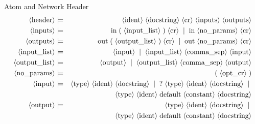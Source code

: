 Atom and Network Header
\begin{eqnarray*}
  \pn{header} &\pp&
    \pn{ident} \ww
    \pn{docstring} \ww
    \pn{cr} \ww
    \pn{inputs} \ww
    \pn{outputs} \\
  \pn{inputs} &\pp&
    \sm{in} \ww
    \sm{(} \ww
    \pn{input{\textunderscore}list} \ww
    \sm{)} \ww
    \pn{cr} \oo
    \sm{in} \ww
    \pn{no{\textunderscore}params} \ww
    \pn{cr} \\
  \pn{outputs} &\pp&
    \sm{out} \ww
    \sm{(} \ww
    \pn{output{\textunderscore}list} \ww
    \sm{)} \ww
    \pn{cr} \oo
    \sm{out} \ww
    \pn{no{\textunderscore}params} \ww
    \pn{cr} \\
  \pn{input{\textunderscore}list} &\pp&
    \pn{input} \oo
    \pn{input{\textunderscore}list} \ww
    \pn{comma{\textunderscore}sep} \ww
    \pn{input} \\
  \pn{output{\textunderscore}list} &\pp&
    \pn{output} \oo
    \pn{output{\textunderscore}list} \ww
    \pn{comma{\textunderscore}sep} \ww
    \pn{output} \\
  \pn{no{\textunderscore}params} &\pp&
    \sm{(} \ww
    \pn{opt{\textunderscore}cr} \ww
    \sm{)} \\
  \pn{input} &\pp&
    \pn{type} \ww
    \pn{ident} \ww
    \pn{docstring} \oo
    \sm{?} \ww
    \pn{type} \ww
    \pn{ident} \ww
    \pn{docstring} \oo \\
    & & \pn{type} \ww
    \pn{ident} \ww
    \sm{default} \ww
    \pn{constant} \ww
    \pn{docstring} \\
  \pn{output} &\pp&
    \pn{type} \ww
    \pn{ident} \ww
    \pn{docstring} \oo \\
    & & \pn{type} \ww
    \pn{ident} \ww
    \sm{default} \ww
    \pn{constant} \ww
    \pn{docstring} \\
\end{eqnarray*}


